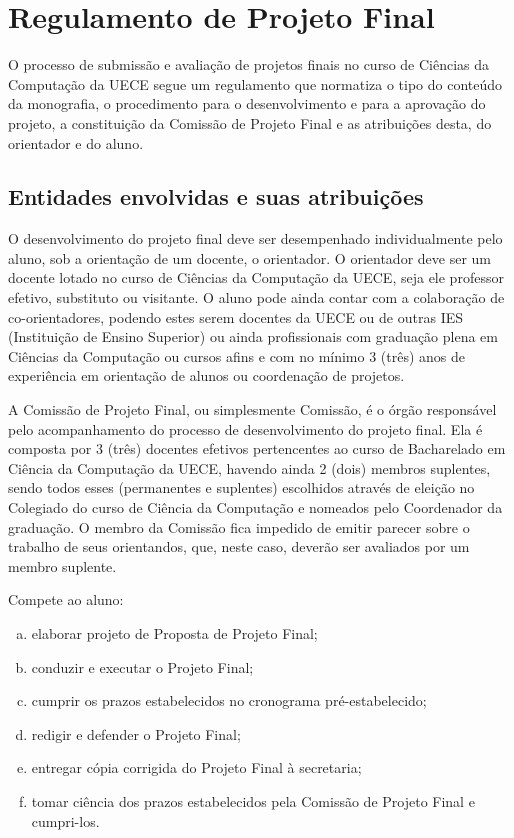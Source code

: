 \chapter{Regulamento de Projeto Final}

O processo de submissão e avaliação de projetos finais no curso
de Ciências da Computação da UECE segue um regulamento que normatiza 
o tipo do conteúdo da monografia, o procedimento para o desenvolvimento 
e para a aprovação do projeto, a constituição da Comissão de Projeto 
Final e as atribuições desta, do orientador e do aluno. 

\section{Entidades envolvidas e suas atribuições}
O desenvolvimento do projeto final deve ser desempenhado individualmente
pelo aluno, sob a orientação de um docente, o orientador. O orientador deve
ser um docente lotado no curso de Ciências da Computação da UECE, seja ele
professor efetivo, substituto ou visitante. O aluno pode ainda contar com a
colaboração de co-orientadores, podendo estes serem docentes da UECE ou de 
outras IES (Instituição de Ensino Superior) ou ainda profissionais com graduação
plena em Ciências da Computação ou cursos afins e com no mínimo 3 (três) anos
de experiência em orientação de alunos ou coordenação de projetos.

A Comissão de Projeto Final, ou simplesmente Comissão,  é o órgão 
responsável pelo acompanhamento do processo de desenvolvimento do projeto final. 
Ela é composta por 3 (três) docentes efetivos pertencentes ao curso de 
Bacharelado em Ciência da Computação da UECE, havendo ainda 2 (dois) membros 
suplentes, sendo todos esses (permanentes e suplentes) escolhidos através de 
eleição no Colegiado do curso de Ciência da Computação e nomeados pelo 
Coordenador da graduação. O membro da Comissão fica impedido de emitir 
parecer sobre o trabalho de seus orientandos, que, neste caso, 
deverão ser avaliados por um membro suplente.

Compete ao aluno:
\begin{enumerate}[a.]
\item elaborar projeto de Proposta de Projeto Final;
\item conduzir e executar o Projeto Final;
\item cumprir os prazos estabelecidos no cronograma pré-estabelecido;
\item redigir e defender o Projeto Final;
\item entregar cópia corrigida do Projeto Final à secretaria;
\item tomar ciência dos prazos estabelecidos pela Comissão de Projeto Final e cumpri-los.
\end{enumerate}


